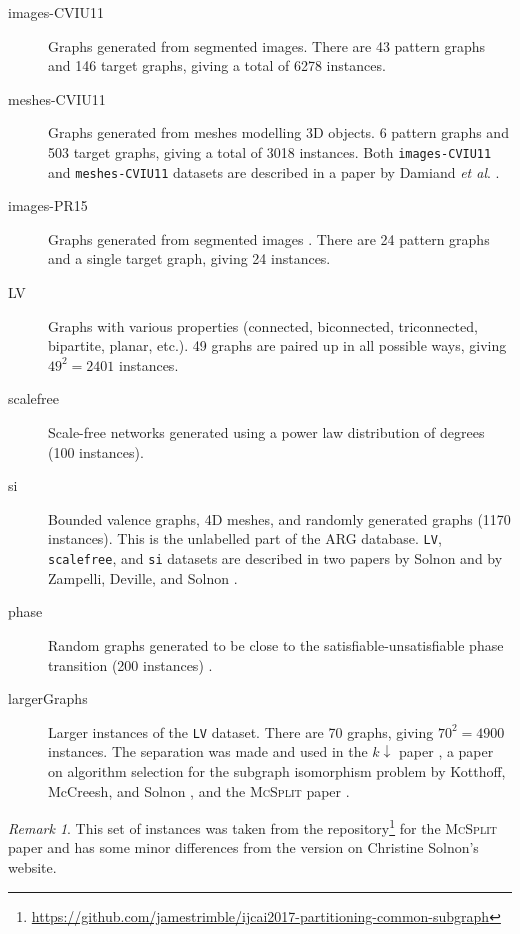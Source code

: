 \documentclass{l4proj}
\theoremstyle{definition}
\theoremstyle{remark}
\newtheorem{remark}{Remark}[chapter]
\newcommand{\etal}{\textit{et al}.}
\begin{document}
\begin{description}
\item[images-CVIU11] Graphs generated from segmented images. There are 43
  pattern graphs and 146 target graphs, giving a total of \num{6278} instances.
\item[meshes-CVIU11] Graphs generated from meshes modelling 3D
  objects. 6 pattern graphs and 503 target graphs, giving a total of \num{3018}
  instances. Both \texttt{images-CVIU11} and \texttt{meshes-CVIU11} datasets are
  described in a paper by Damiand \etal{} \cite{DBLP:journals/cviu/DamiandSHJS11}.
\item[images-PR15] Graphs generated from segmented images
  \cite{DBLP:journals/pr/SolnonDHJ15}. There are 24 pattern graphs and a single
  target graph, giving 24 instances.
\item[LV] Graphs with various properties (connected, biconnected, triconnected,
  bipartite, planar, etc.). 49 graphs are paired up in all possible ways, giving
  $49^2=\num{2401}$ instances.
\item[scalefree] Scale-free networks generated using a power law distribution of
  degrees (100 instances).
\item[si] Bounded valence graphs, 4D meshes, and randomly generated graphs
  (\num{1170} instances). This is the unlabelled part of the ARG database.
  \texttt{LV}, \texttt{scalefree}, and \texttt{si} datasets are described in
  two papers by Solnon \cite{DBLP:journals/ai/Solnon10} and by Zampelli,
  Deville, and Solnon \cite{DBLP:journals/constraints/ZampelliDS10}.
\item[phase] Random graphs generated to be close to the
  satisfiable-unsatisfiable phase transition (200 instances)
  \cite{DBLP:conf/ijcai/McCreeshPT16}.
\item[largerGraphs] Larger instances of the \texttt{LV} dataset. There are 70
  graphs, giving $70^2=\num{4900}$ instances. The separation was made and used
  in the $k{\downarrow}$ paper \cite{DBLP:conf/aaai/HoffmannMR17}, a paper on
  algorithm selection for the subgraph isomorphism problem by Kotthoff,
  McCreesh, and Solnon \cite{DBLP:conf/lion/KotthoffMS16}, and the
  \textsc{McSplit} paper \cite{DBLP:conf/ijcai/McCreeshPT17}.
\end{description}

\begin{remark}
This set of instances was taken from the
repository\footnote{\url{https://github.com/jamestrimble/ijcai2017-partitioning-common-subgraph}}
for the \textsc{McSplit} paper \cite{DBLP:conf/ijcai/McCreeshPT17} and has some
minor differences from the version on Christine Solnon's website.
\end{remark}
\end{document}
